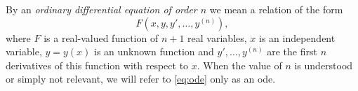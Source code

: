 By an \textit{ordinary differential equation of order $n$} we mean a relation of the form
\begin{equation}
\label{eq:ode}
F(x, y, y', \dots, y^{(n)}),
\end{equation}
where $F$ is a real-valued function of $n+1$ real variables, $x$ is an independent variable, $y=y(x)$ is an unknown function and $y', \dots, y^{(n)}$ are the first $n$ derivatives of this function with respect to $x$. When the value of $n$ is understood or simply not relevant, we will refer to \eqref{eq:ode} only as an \gls{ode}.
